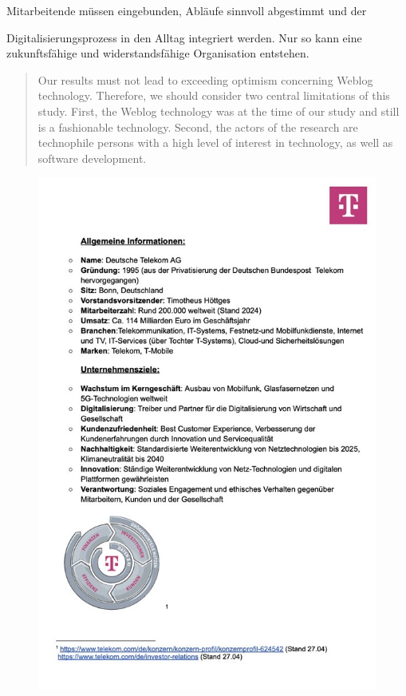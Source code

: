 \documentclass[12pt,a4paper]{article}
\newcommand{\zitat}[1]{\parencite{#1}}
\newcommand{\absatzZitat}[1]{%
	\begin{quote}
		\fontsize{10pt}{12pt}\selectfont
		\setstretch{1.0}
		\leftskip=1cm
		\rightskip=1cm
		\justifying
		#1
	\end{quote}
}
\begin{document}
	\noindent Mitarbeitende müssen eingebunden, Abläufe sinnvoll abgestimmt und der
	
	\noindent Digitalisierungsprozess in den Alltag integriert werden. Nur so kann
	eine zukunftsfähige und widerstandsfähige Organisation entstehen.
	\absatzZitat{
		Our results must not lead to exceeding optimism concerning Weblog technology.
		Therefore, we should consider two central limitations of this study. First, the Weblog
		technology was at the time of our study and still is a fashionable technology. Second, the
		actors of the research are technophile persons with a high level of interest in technology,
		as well as software development.\\
		\zitat{maier}
	}
	
	
	
	
	
	\newpage
	\printbibliography[heading=bibintoc,title={Literaturverzeichnis}]
	
	
	\newpage
	\thispagestyle{empty} %
	\begin{figure}[H]
		\centering
		\includegraphics{images/Bild1.jpg}
	\end{figure}
	\newpage
	\newpage
\end{document}
